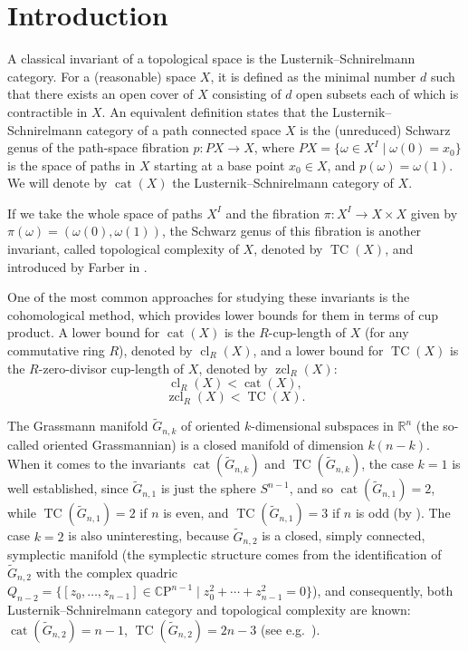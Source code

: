 \documentclass{amsart}
\theoremstyle{definition}
\theoremstyle{remark}
\numberwithin{equation}{section}
\newcommand{\R}{\mathbb R}
\newcommand{\gr}{\widetilde G}
\newcommand{\cl}{\operatorname{cl}}
\newcommand{\zcl}{\operatorname{zcl}}
\newcommand{\cat}{\operatorname{cat}}
\newcommand{\tc}{\operatorname{TC}}
\newcommand{\arr}{\rightarrow}
\begin{document}
\section{Introduction}
\label{sec:introduction}

A classical invariant of a topological space is the Lusternik--Schnirelmann category. For a (reasonable) space $X$, it is defined as the minimal number $d$ such that there exists an open cover of $X$ consisting of $d$ open subsets each of which is contractible in $X$. An equivalent definition states that the Lusternik--Schnirelmann category of a path connected space $X$ is the (unreduced) Schwarz genus of the path-space fibration $p:PX\arr X$, where $PX=\{\omega\in X^I\mid\omega(0)=x_0\}$ is the space of paths in $X$ starting at a base point $x_0\in X$, and $p(\omega)=\omega(1)$. We will denote by $\cat(X)$ the Lusternik--Schnirelmann category of $X$.

If we take the whole space of paths $X^I$ and the fibration $\pi:X^I\arr X\times X$ given by $\pi(\omega)=(\omega(0),\omega(1))$, the Schwarz genus of this fibration is another invariant, called topological complexity of $X$, denoted by $\tc(X)$, and introduced by Farber in \cite{Farber}.

One of the most common approaches for studying these invariants is the cohomological method, which provides lower bounds for them in terms of cup product. A lower bound for $\cat(X)$ is the $R$-cup-length of $X$ (for any commutative ring $R$), denoted by $\cl_R(X)$, and a lower bound for $\tc(X)$ is the $R$-zero-divisor cup-length of $X$, denoted by $\zcl_R(X)$:
\begin{equation}\label{eq:cat>1+cup}
    \cl_R(X)<\cat(X),
\end{equation} 
\begin{equation}\label{eq:TC>1+zcl}
     \zcl_R(X) < \tc(X).
\end{equation}

The Grassmann manifold $\gr_{n,k}$ of oriented $k$-dimensional subspaces in $\R^n$ (the so-called oriented Grassmannian) is a closed manifold of dimension $k(n-k)$. When it comes to the invariants $\cat(\gr_{n,k})$ and $\tc(\gr_{n,k})$, the case $k=1$ is well established, since $\gr_{n,1}$ is just the sphere $S^{n-1}$, and so $\cat(\gr_{n,1})=2$, while $\tc(\gr_{n,1})=2$ if $n$ is even, and $\tc(\gr_{n,1})=3$ if $n$ is odd (by \cite[Theorem 8]{Farber}). The case $k=2$ is also uninteresting, because $\gr_{n,2}$ is a closed, simply connected, symplectic manifold (the symplectic structure comes from the identification of $\gr_{n,2}$ with the complex quadric $Q_{n-2}=\{[z_0,\ldots,z_{n-1}]\in\mathbb C\mathrm P^{n-1}\mid z_0^2+\cdots+z_{n-1}^2=0\}$), and consequently, both Lusternik--Schnirelmann category and topological complexity are known: $\cat(\gr_{n,2})=n-1$, $\tc(\gr_{n,2})=2n-3$ (see e.g.\ \cite[Proposition 2.3]{pavesic}).
\end{document}

